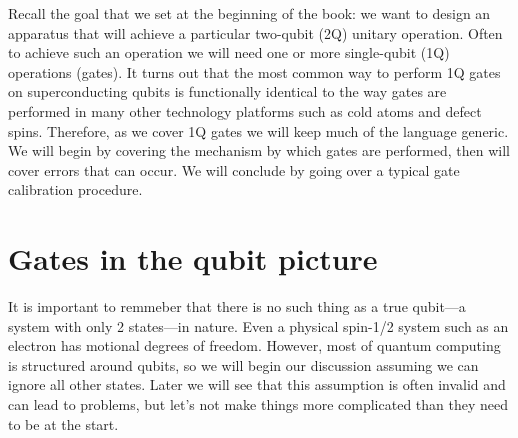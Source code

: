 Recall the goal that we set at the beginning of the book: we want to design an apparatus that will achieve a particular two-qubit (2Q) unitary operation. Often to achieve such an operation we will need one or more single-qubit (1Q) operations (gates). It turns out that the most common way to perform 1Q gates on superconducting qubits is functionally identical to the way gates are performed in many other technology platforms such as cold atoms and defect spins. Therefore, as we cover 1Q gates we will keep much of the language generic. We will begin by covering the mechanism by which gates are performed, then will cover errors that can occur. We will conclude by going over a typical gate calibration procedure.

\section{Gates in the qubit picture}
It is important to remmeber that there is no such thing as a true qubit---a system with only 2 states---in nature. Even a physical spin-1/2 system such as an electron has motional degrees of freedom. However, most of quantum computing is structured around qubits, so we will begin our discussion assuming we can ignore all other states. Later we will see that this assumption is often invalid and can lead to problems, but let's not make things more complicated than they need to be at the start.

